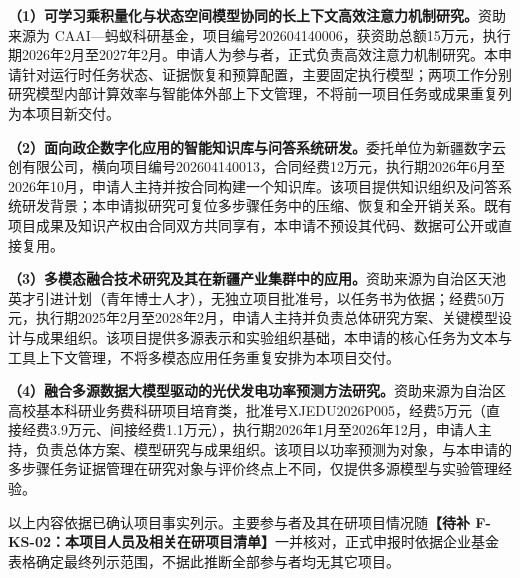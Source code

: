 \justifying
\NSFCBodyText

\textbf{（1）可学习乘积量化与状态空间模型协同的长上下文高效注意力机制研究。}资助来源为 CAAI—蚂蚁科研基金，项目编号202604140006，获资助总额15万元，执行期2026年2月至2027年2月。申请人为参与者，正式负责高效注意力机制研究。本申请针对运行时任务状态、证据恢复和预算配置，主要固定执行模型；两项工作分别研究模型内部计算效率与智能体外部上下文管理，不将前一项目任务或成果重复列为本项目新交付。

\textbf{（2）面向政企数字化应用的智能知识库与问答系统研发。}委托单位为新疆数字云创有限公司，横向项目编号202604140013，合同经费12万元，执行期2026年6月至2026年10月，申请人主持并按合同构建一个知识库。该项目提供知识组织及问答系统研发背景；本申请拟研究可复位多步骤任务中的压缩、恢复和全开销关系。既有项目成果及知识产权由合同双方共同享有，本申请不预设其代码、数据可公开或直接复用。

\textbf{（3）多模态融合技术研究及其在新疆产业集群中的应用。}资助来源为自治区天池英才引进计划（青年博士人才），无独立项目批准号，以任务书为依据；经费50万元，执行期2025年2月至2028年2月，申请人主持并负责总体研究方案、关键模型设计与成果组织。该项目提供多源表示和实验组织基础，本申请的核心任务为文本与工具上下文管理，不将多模态应用任务重复安排为本项目交付。

\textbf{（4）融合多源数据大模型驱动的光伏发电功率预测方法研究。}资助来源为自治区高校基本科研业务费科研项目培育类，批准号XJEDU2026P005，经费5万元（直接经费3.9万元、间接经费1.1万元），执行期2026年1月至2026年12月，申请人主持，负责总体方案、模型研究与成果组织。该项目以功率预测为对象，与本申请的多步骤任务证据管理在研究对象与评价终点上不同，仅提供多源模型与实验管理经验。

以上内容依据已确认项目事实列示。主要参与者及其在研项目情况随\textbf{【待补 F-KS-02：本项目人员及相关在研项目清单】}一并核对，正式申报时依据企业基金表格确定最终列示范围，不据此推断全部参与者均无其它项目。
